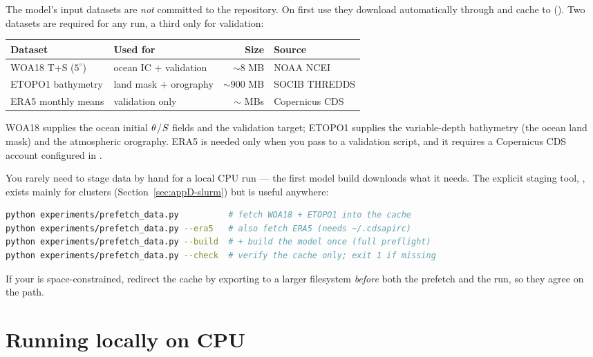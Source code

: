 The model's input datasets are \emph{not} committed to the repository. On first
use they download automatically through  and cache to
 ().
Two datasets are required for any run, a third only for validation:

\begin{center}
\begin{tabular}{@{}llrl@{}}
\toprule
Dataset & Used for & Size & Source \\
\midrule
WOA18 T+S ($5^\circ$) & ocean IC + validation & $\sim 8$ MB & NOAA NCEI \\
ETOPO1 bathymetry & land mask + orography & $\sim 900$ MB & SOCIB THREDDS \\
ERA5 monthly means & validation only & $\sim$ MBs & Copernicus CDS \\
\bottomrule
\end{tabular}
\end{center}

\noindent WOA18 supplies the ocean initial $\theta$/$S$ fields and the
validation target; ETOPO1 supplies the variable-depth bathymetry (the ocean land
mask) and the atmospheric orography. ERA5 is needed only when you pass
 to a validation script, and it requires a Copernicus CDS account
configured in .

You rarely need to stage data by hand for a local CPU run --- the first model
build downloads what it needs. The explicit staging tool,
, exists mainly
for clusters (Section~\ref{sec:appD-slurm}) but is useful anywhere:

\begin{lstlisting}[language=bash]
python experiments/prefetch_data.py          # fetch WOA18 + ETOPO1 into the cache
python experiments/prefetch_data.py --era5   # also fetch ERA5 (needs ~/.cdsapirc)
python experiments/prefetch_data.py --build  # + build the model once (full preflight)
python experiments/prefetch_data.py --check  # verify the cache only; exit 1 if missing
\end{lstlisting}

\noindent If your  is space-constrained, redirect the cache by
exporting  to a larger filesystem \emph{before} both the
prefetch and the run, so they agree on the path.

\section{Running locally on CPU}\label{sec:appD-cpu}

